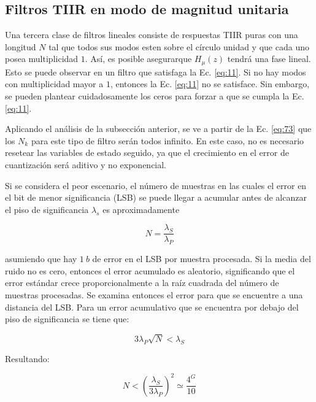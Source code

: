 \message{ !name(../main.tex)}\documentclass[journal,transmag]{IEEEtran}
\begin{document}
\subsection{Filtros TIIR en modo de magnitud unitaria}
    Una tercera clase de filtros lineales consiste de respuestas TIIR puras con una longitud $N$ tal que todos sus modos esten sobre el círculo unidad y que cada uno posea multiplicidad $1$. Así, es posible asegurarque $H_{\mu}(z)$ tendrá una fase lineal. Esto se puede observar en un filtro que satisfaga la Ec. \ref{eq:11}. Si no hay modos con multiplicidad mayor a $1$, entonces la Ec. \ref{eq:11} no se satisface. Sin embargo, se pueden plantear cuidadosamente los ceros para forzar a que se cumpla la Ec. \ref{eq:11}.

    Aplicando el análisis de la subsección anterior, se ve a partir de la Ec. \ref{eq:73} que los $N_k$ para este tipo de filtro serán todos infinito. En este caso, no es necesario resetear las variables de estado seguido, ya que el crecimiento en el error de cuantización será aditivo y no exponencial.

    Si se considera el peor escenario, el número de muestras en las cuales el error en el bit de menor significancia (LSB) se puede llegar a acumular antes de alcanzar el piso de significancia $\lambda_s$ es aproximadamente

    \begin{equation}
      N = \frac{\lambda_S}{\lambda_P}
    \end{equation}

    asumiendo que hay $1 \: b$ de error en el LSB por muestra procesada. Si la media del ruido no es cero, entonces el error acumulado es aleatorio, significando que el error estándar crece proporcionalmente a la raíz cuadrada del número de muestras procesadas. Se examina entonces el error para que se encuentre a una distancia del LSB. Para un error acumulativo que se encuentra por debajo del piso de significancia se tiene que:

    \begin{equation}
      3 \lambda_P \sqrt{N} < \lambda_S
    \end{equation}

    Resultando:

    \begin{equation}
      N < \left( \frac{\lambda_S}{3 \lambda_P} \right)^2 \simeq \frac{4^G}{10}
    \end{equation}
\end{document}
